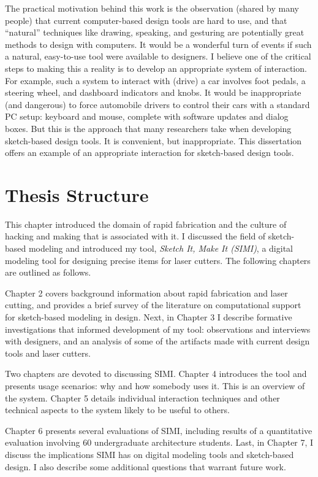 The practical motivation behind this work is the observation (shared
by many people) that current computer-based design tools are hard to
use, and that ``natural'' techniques like drawing, speaking, and
gesturing are potentially great methods to design with computers. It
would be a wonderful turn of events if such a natural, easy-to-use
tool were available to designers. I believe one of the critical steps
to making this a reality is to develop an appropriate system of
interaction. For example, such a system to interact with (drive) a car
involves foot pedals, a steering wheel, and dashboard indicators and
knobs. It would be inappropriate (and dangerous) to force automobile
drivers to control their cars with a standard PC setup: keyboard and
mouse, complete with software updates and dialog boxes. But this is
the approach that many researchers take when developing sketch-based
design tools. It is convenient, but inappropriate. This dissertation
offers an example of an appropriate interaction for sketch-based
design tools.

\section{Thesis Structure}

This chapter introduced the domain of rapid fabrication and the
culture of hacking and making that is associated with it.  I discussed
the field of sketch-based modeling and introduced my tool,
\textit{Sketch It, Make It (SIMI)}, a digital modeling tool for
designing precise items for laser cutters. The following chapters are
outlined as follows.

Chapter 2 covers background information about rapid fabrication and
laser cutting, and provides a brief survey of the literature on
computational support for sketch-based modeling in design. Next, in
Chapter 3 I describe formative investigations that informed
development of my tool: observations and interviews with designers,
and an analysis of some of the artifacts made with current design
tools and laser cutters.

Two chapters are devoted to discussing SIMI. Chapter 4 introduces the
tool and presents usage scenarios: why and how somebody uses it. This
is an overview of the system. Chapter 5 details individual interaction
techniques and other technical aspects to the system likely to be
useful to others.

Chapter 6 presents several evaluations of SIMI, including results of a
quantitative evaluation involving 60 undergraduate architecture
students. Last, in Chapter 7, I discuss the implications SIMI has on
digital modeling tools and sketch-based design. I also describe some
additional questions that warrant future work.
